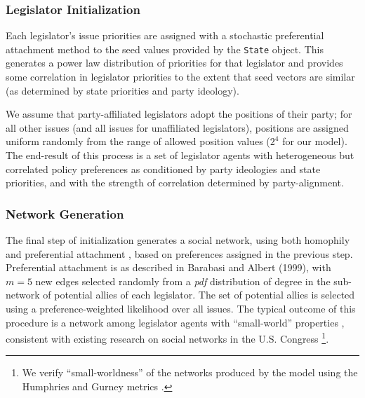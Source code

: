 \documentclass[pdftex,12pt,oribibl]{llncs}
\begin{document}
\subsubsection{Legislator Initialization}
Each legislator's issue priorities are assigned with a stochastic preferential attachment method to the seed values provided by the \texttt{State} object.
This generates a power law distribution of priorities for that legislator and provides some correlation in legislator priorities to the extent that seed vectors are similar (as determined by state priorities and party ideology).

We assume that party-affiliated legislators adopt the positions of their party; for all other issues (and all issues for unaffiliated legislators), positions are assigned uniform randomly from the range of allowed position values ($2^4$ for our model).
The end-result of this process is a set of legislator agents with heterogeneous but correlated policy preferences as conditioned by party ideologies and state priorities, and with the strength of correlation determined by party-alignment.
\subsubsection{Network Generation}
The final step of initialization generates a social network, using both homophily \parencite{msc01, br11} and preferential attachment \parencite{Barabasi1999}, based on preferences assigned in the previous step. 
Preferential attachment is as described in Barabasi and Albert (1999), with $m=5$ new edges selected randomly from a \textit{pdf} distribution of degree in the sub-network of potential allies of each legislator. 
The set of potential allies is selected using a preference-weighted likelihood over all issues.
The typical outcome of this procedure is a network among legislator agents with ``small-world'' properties \parencite{Watts1998}, consistent with existing research on social networks in the U.S. Congress \parencite{Granovetter1978} \footnote{We verify ``small-worldness'' of the networks produced by the model using the Humphries and Gurney metrics \parencite{hg08}.}.
\end{document}
